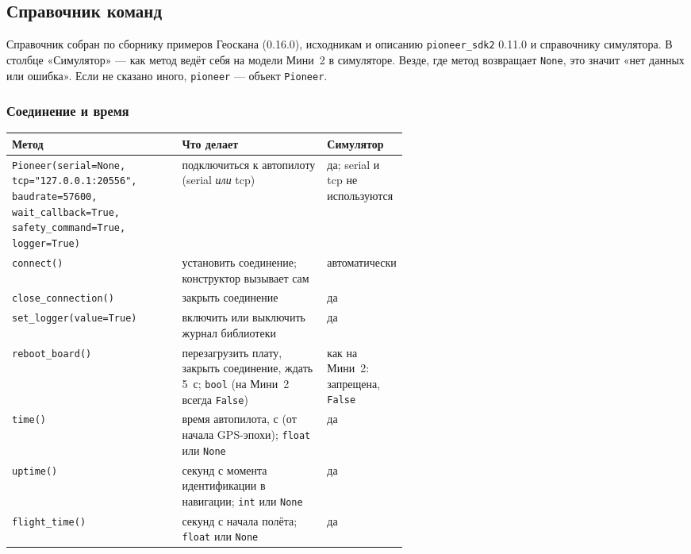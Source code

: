 \subsection{Справочник команд}

Справочник собран по сборнику примеров Геоскана (0.16.0), исходникам и описанию \texttt{pioneer\_sdk2} 0.11.0 и справочнику симулятора. В столбце «Симулятор» --- как метод ведёт себя на модели Мини~2 в симуляторе. Везде, где метод возвращает \verb|None|, это значит «нет данных или ошибка». Если не сказано иного, \verb|pioneer| --- объект \verb|Pioneer|.

\subsubsection*{Соединение и время}

\begin{center}
\footnotesize
\begin{tabularx}{\linewidth}{@{}>{\raggedright\arraybackslash}p{0.43\linewidth} >{\raggedright\arraybackslash}X >{\raggedright\arraybackslash}p{0.15\linewidth}@{}}
\toprule
\textbf{Метод} & \textbf{Что делает} & \textbf{Симулятор} \\
\midrule
\verb|Pioneer(serial=None,| \verb|tcp="127.0.0.1:20556",| \verb|baudrate=57600,| \verb|wait_callback=True,| \verb|safety_command=True,| \verb|logger=True)| & подключиться к автопилоту (serial \emph{или} tcp) & да; serial и tcp не используются \\
\verb|connect()| & установить соединение; конструктор вызывает сам & автоматически \\
\verb|close_connection()| & закрыть соединение & да \\
\verb|set_logger(value=True)| & включить или выключить журнал библиотеки & да \\
\verb|reboot_board()| & перезагрузить плату, закрыть соединение, ждать 5~с; \verb|bool| (на Мини~2 всегда \verb|False|) & как на Мини~2: запрещена, \verb|False| \\
\verb|time()| & время автопилота, с (от начала GPS-эпохи); \verb|float| или \verb|None| & да \\
\verb|uptime()| & секунд с момента идентификации в навигации; \verb|int| или \verb|None| & да \\
\verb|flight_time()| & секунд с начала полёта; \verb|float| или \verb|None| & да \\
\bottomrule
\end{tabularx}
\end{center}

